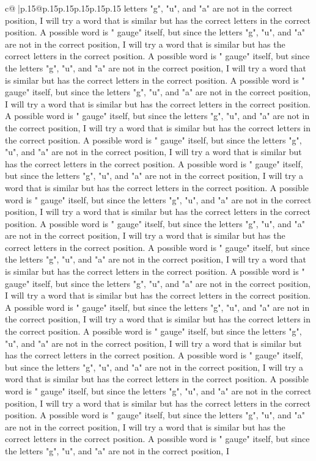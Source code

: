 \documentclass{article}
\begin{document}
{\begin{supertabular}{c@{$\;$}|p{.15\linewidth}@{}p{.15\linewidth}p{.15\linewidth}p{.15\linewidth}p{.15\linewidth}p{.15\linewidth}}
{{{letters "g", "u", and "a" are not in the correct position, I will try a word that is similar but has the correct letters in the correct position. A possible word is " gauge" itself, but since the letters "g", "u", and "a" are not in the correct position, I will try a word that is similar but has the correct letters in the correct position. A possible word is " gauge" itself, but since the letters "g", "u", and "a" are not in the correct position, I will try a word that is similar but has the correct letters in the correct position. A possible word is " gauge" itself, but since the letters "g", "u", and "a" are not in the correct position, I will try a word that is similar but has the correct letters in the correct position. A possible word is " gauge" itself, but since the letters "g", "u", and "a" are not in the correct position, I will try a word that is similar but has the correct letters in the correct position. A possible word is " gauge" itself, but since the letters "g", "u", and "a" are not in the correct position, I will try a word that is similar but has the correct letters in the correct position. A possible word is " gauge" itself, but since the letters "g", "u", and "a" are not in the correct position, I will try a word that is similar but has the correct letters in the correct position. A possible word is " gauge" itself, but since the letters "g", "u", and "a" are not in the correct position, I will try a word that is similar but has the correct letters in the correct position. A possible word is " gauge" itself, but since the letters "g", "u", and "a" are not in the correct position, I will try a word that is similar but has the correct letters in the correct position. A possible word is " gauge" itself, but since the letters "g", "u", and "a" are not in the correct position, I will try a word that is similar but has the correct letters in the correct position. A possible word is " gauge" itself, but since the letters "g", "u", and "a" are not in the correct position, I will try a word that is similar but has the correct letters in the correct position. A possible word is " gauge" itself, but since the letters "g", "u", and "a" are not in the correct position, I will try a word that is similar but has the correct letters in the correct position. A possible word is " gauge" itself, but since the letters "g", "u", and "a" are not in the correct position, I will try a word that is similar but has the correct letters in the correct position. A possible word is " gauge" itself, but since the letters "g", "u", and "a" are not in the correct position, I will try a word that is similar but has the correct letters in the correct position. A possible word is " gauge" itself, but since the letters "g", "u", and "a" are not in the correct position, I will try a word that is similar but has the correct letters in the correct position. A possible word is " gauge" itself, but since the letters "g", "u", and "a" are not in the correct position, I will try a word that is similar but has the correct letters in the correct position. A possible word is " gauge" itself, but since the letters "g", "u", and "a" are not in the correct position, I }}}
\end{supertabular}}
\end{document}
